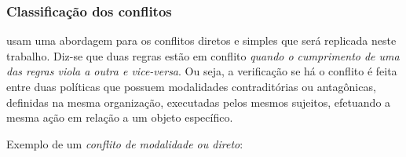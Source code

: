 \documentclass[
	12pt,				%
	openright,			%
	oneside,			%
	a4paper,			%
	english,			%
	french,				%
	spanish,			%
	brazil				%
	]{abntex2}
\begin{document}
%


\subsubsection{Classificação dos conflitos}\label{subsec-classificacao-conflito}
 usam uma abordagem para os conflitos diretos e simples que será replicada neste trabalho. Diz-se que duas regras estão em conflito \textit{quando o cumprimento de uma das regras viola a outra e vice-versa}. Ou seja, a verificação se há o conflito é feita entre duas políticas que possuem modalidades contraditórias ou antagônicas, definidas na mesma organização, executadas pelos mesmos sujeitos, efetuando a mesma ação em relação a um objeto específico.

Exemplo de um \textit{conflito de modalidade ou direto}:
\end{document}
